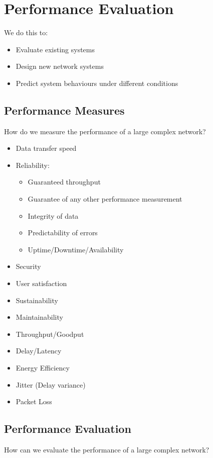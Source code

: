 \section{Performance Evaluation}\label{sec:Performance_Evaluation}
We do this to:
\begin{itemize}[noitemsep]
\item Evaluate existing systems
\item Design new network systems
\item Predict system behaviours under different conditions
\end{itemize}

\subsection{Performance Measures}\label{subsec:Performance_Measures}
How do we measure the performance of a large complex network?

\begin{itemize}[noitemsep]
\item Data transfer speed
\item Reliability:
  \begin{itemize}[noitemsep]
  \item Guaranteed throughput
  \item Guarantee of any other performance measurement
  \item Integrity of data
  \item Predictability of errors
  \item Uptime/Downtime/Availability
  \end{itemize}

\item Security
\item User satisfaction
\item Sustainability
\item Maintainability
\item Throughput/Goodput
\item Delay/Latency
\item Energy Efficiency
\item Jitter (Delay variance)
\item Packet Loss
\end{itemize}

\subsection{Performance Evaluation}\label{subsec:Performance_Evaluation}
How can we evaluate the performance of a large complex network?

